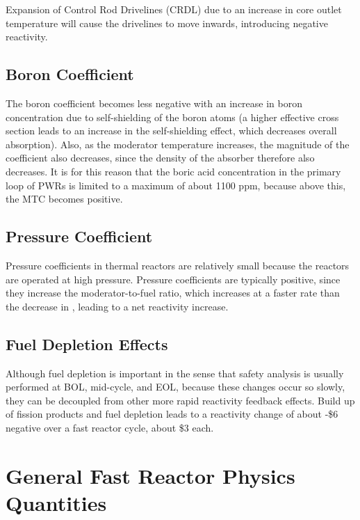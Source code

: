 \documentclass[10pt]{article}
\begin{document}
\begin{flushleft}
Expansion of Control Rod Drivelines (CRDL) due to an increase in core outlet temperature will cause the drivelines to move inwards, introducing negative reactivity.

\subsection{Boron Coefficient}

The boron coefficient becomes less negative with an increase in boron concentration due to self-shielding of the boron atoms (a higher effective cross section leads to an increase in the self-shielding effect, which decreases overall absorption). Also, as the moderator temperature increases, the magnitude of the coefficient also decreases, since the density of the absorber therefore also decreases. It is for this reason that the boric acid concentration in the primary loop of PWRs is limited to a maximum of about 1100 ppm, because above this, the MTC becomes positive.

\subsection{Pressure Coefficient}

Pressure coefficients in thermal reactors are relatively small because the reactors are operated at high pressure. Pressure coefficients are typically positive, since they increase the moderator-to-fuel ratio, which increases at a faster rate than the decrease in , leading to a net reactivity increase.

\subsection{Fuel Depletion Effects}

Although fuel depletion is important in the sense that safety analysis is usually performed at BOL, mid-cycle, and EOL, because these changes occur so slowly, they can be decoupled from other more rapid reactivity feedback effects. Build up of fission products and fuel depletion leads to a reactivity change of about -\$6 negative over a fast reactor cycle, about \$3 each. 






\section{General Fast Reactor Physics Quantities}








\end{flushleft}
\end{document}
